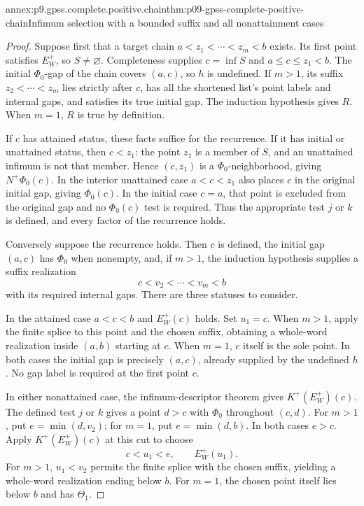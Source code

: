 \begin{annexitem}{annex:p9.gpss.complete.positive.chain}{thm:p09-gpss-complete-positive-chain}{Infimum selection with a bounded suffix and all nonattainment cases}
\begin{proof}
Suppose first that a target chain
\(a<z_1<\cdots<z_m<b\) exists. Its first
point satisfies \(E^+_W\), so \(S\ne\varnothing\).
Completeness supplies \(c=\inf S\) and
\(a\leq c\leq z_1<b\). The initial
\(\Phi_0\)-gap of the chain covers
\((a,c)\), so \(h\) is undefined.
If \(m>1\), its suffix
\(z_2<\cdots<z_m\) lies strictly after
\(c\), has all the shortened list's
point labels and internal gaps, and
satisfies its true initial gap.
The induction hypothesis gives \(R\).
When \(m=1\), \(R\) is true by definition.

If \(c\) has attained status, these
facts suffice for the recurrence.
If it has initial or unattained status,
then \(c<z_1\): the point \(z_1\)
is a member of \(S\), and an unattained
infimum is not that member. Hence
\((c,z_1)\) is a \(\Phi_0\)-neighborhood,
giving \(N^+\Phi_0(c)\). In the
interior unattained case \(a<c<z_1\)
also places \(c\) in the original
initial gap, giving \(\Phi_0(c)\).
In the initial case \(c=a\), that
point is excluded from the original
gap and no \(\Phi_0(c)\) test is
required. Thus the appropriate
test \(j\) or \(k\) is defined,
and every factor of the recurrence
holds.

Conversely suppose the recurrence
holds. Then \(c\) is defined,
the initial gap \((a,c)\) has
\(\Phi_0\) when nonempty, and,
if \(m>1\), the induction
hypothesis supplies a suffix
realization
\[
                         c<v_2<\cdots<v_m<b
\]
with its required internal gaps.
There are three statuses to consider.

In the attained case \(a<c<b\)
and \(E^+_W(c)\) holds. Set
\(u_1=c\). When \(m>1\), apply
the finite splice to this point
and the chosen suffix, obtaining
a whole-word realization inside
\((a,b)\) starting at \(c\).
When \(m=1\), \(c\) itself is
the sole point. In both cases
the initial gap is precisely
\((a,c)\), already supplied
by the undefined \(h\).
No gap label is required at
the first point \(c\).

In either nonattained case,
the infimum-descriptor theorem
gives \(K^+(E^+_W)(c)\).
The defined test \(j\) or \(k\)
gives a point \(d>c\) with
\(\Phi_0\) throughout \((c,d)\).
For \(m>1\), put \(e=\min(d,v_2)\);
for \(m=1\), put \(e=\min(d,b)\).
In both cases \(e>c\).
Apply \(K^+(E^+_W)(c)\) at this
cut to choose
\[
                          c<u_1<e,\qquad E^+_W(u_1).
\]
For \(m>1\), \(u_1<v_2\)
permits the finite splice with
the chosen suffix, yielding a
whole-word realization ending
below \(b\). For \(m=1\),
the chosen point itself lies
below \(b\) and has \(\Theta_1\).


\end{proof}
\end{annexitem}
